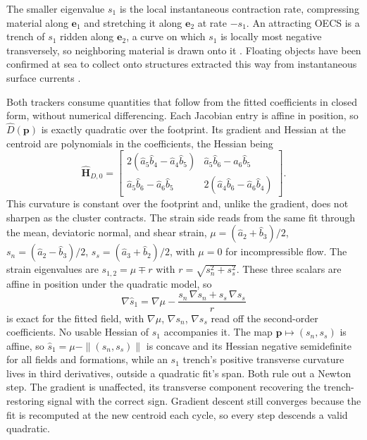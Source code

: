 \documentclass[lettersize,journal]{IEEEtran}
\begin{document}
The smaller eigenvalue $s_1$ is the local instantaneous contraction
rate, compressing material along $\mathbf{e}_1$ and stretching it along
$\mathbf{e}_2$ at rate $-s_1$. An attracting OECS is a trench of $s_1$
ridden along $\mathbf{e}_2$, a curve on which $s_1$ is locally most
negative transversely, so neighboring material is drawn onto it
\cite{17}. Floating objects have been confirmed at sea to collect onto
structures extracted this way from instantaneous surface currents
\cite{12}.

Both trackers consume quantities that follow from the fitted
coefficients in closed form, without numerical differencing. Each Jacobian entry is affine in position, so $\hat{D}(\mathbf{p})$ is exactly quadratic over the footprint. Its gradient and Hessian at the centroid are polynomials in the coefficients, the Hessian being
\begin{equation}
    \hat{\mathbf{H}}_{D,0} =
    \begin{bmatrix}
        2(\hat{a}_5 \hat{b}_4 - \hat{a}_4 \hat{b}_5) &
        \hat{a}_5 \hat{b}_6 - \hat{a}_6 \hat{b}_5 \\
        \hat{a}_5 \hat{b}_6 - \hat{a}_6 \hat{b}_5 &
        2(\hat{a}_4 \hat{b}_6 - \hat{a}_6 \hat{b}_4)
    \end{bmatrix}.
    \label{eq:hess_det}
\end{equation}
This curvature is constant over the footprint and, unlike the gradient,
does not sharpen as the cluster contracts. The strain side reads from the same fit through the mean, deviatoric
normal, and shear strain, $\mu =
(\hat{a}_2 + \hat{b}_3)/2$, $s_n = (\hat{a}_2 - \hat{b}_3)/2$, $s_s =
(\hat{a}_3 + \hat{b}_2)/2$, with $\mu = 0$ for incompressible flow.
The strain eigenvalues are $s_{1,2} = \mu \mp r$ with $r = \sqrt{s_n^2
+ s_s^2}$. These three scalars are affine in position under the
quadratic model, so
\begin{equation}
    \nabla \hat{s}_1 = \nabla\mu
    - \frac{s_n\,\nabla s_n + s_s\,\nabla s_s}{r}
    \label{eq:grad_s1}
\end{equation}
is exact for the fitted field, with $\nabla\mu$, $\nabla s_n$, $\nabla
s_s$ read off the second-order coefficients. No usable Hessian of $s_1$ accompanies it. The map
$\mathbf{p} \mapsto (s_n, s_s)$ is affine, so $\hat{s}_1 = \mu -
\|(s_n, s_s)\|$ is concave and its Hessian negative semidefinite for
all fields and formations, while an $s_1$ trench's positive transverse curvature lives in third
derivatives, outside a quadratic fit's span. Both rule out a Newton step. The gradient is unaffected, its transverse
component recovering the trench-restoring signal with the correct sign.
Gradient descent still converges because the fit is recomputed at the
new centroid each cycle, so every step descends a valid quadratic.
\end{document}
